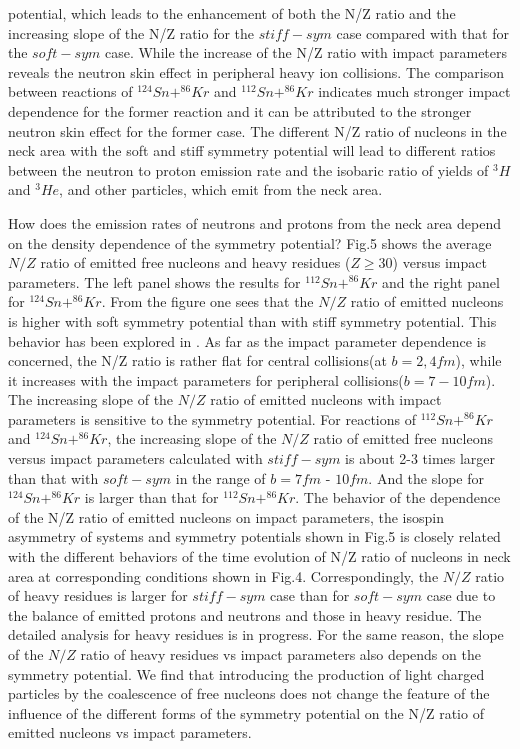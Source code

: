 \documentclass[aps,prc,groupedaddress,showpacs,manuscript]{revtex4}
\begin{document}
potential, which leads to the enhancement of both the N/Z ratio
and the increasing slope of the N/Z ratio for the $stiff-sym$ case
compared with that for the $soft-sym$ case. While the increase of
the N/Z ratio with impact parameters reveals the neutron skin
effect in peripheral heavy ion collisions. The comparison between
reactions of $^{124}Sn+^{86}Kr$ and $^{112}Sn+^{86}Kr$ indicates
much stronger impact dependence for the former reaction and it can
be attributed to the stronger neutron skin effect for the former
case. The different N/Z ratio of nucleons in the neck area with
the soft and stiff symmetry potential will lead to different
ratios between the neutron to proton emission rate and the
isobaric ratio of yields of $^{3}H $ and $^{3}He$, and other
particles, which emit from the neck area.

How does the emission rates of neutrons and protons from the neck
area depend on the density dependence of the symmetry potential?
Fig.5 shows the average $N/Z$ ratio of emitted free nucleons and
heavy residues ($Z\ge30$) versus impact parameters. The left panel
shows the results for $^{112}Sn+^{86}Kr$ and the right panel for
$^{124}Sn+^{86}Kr$. From the figure one sees that the $N/Z$ ratio
of emitted nucleons is higher with soft symmetry potential than
with stiff symmetry potential. This behavior has been explored in
\cite{BALi97}. As far as the impact parameter dependence is
concerned, the N/Z ratio is rather flat for central collisions(at
$b=2,4fm$), while it increases with the impact parameters for
peripheral collisions($b=7-10fm$).  The increasing slope of the
$N/Z$ ratio of emitted nucleons with impact parameters is
sensitive to the symmetry potential. For reactions of
$^{112}Sn+^{86}Kr$ and $^{124}Sn+^{86}Kr$, the increasing slope of
the $N/Z$ ratio of emitted free nucleons versus impact parameters
calculated with $stiff-sym$ is about 2-3 times larger than that
with $soft-sym$ in the range of $b=7fm$ - $10fm$. And the slope
for $^{124}Sn+^{86}Kr$ is larger than that for $^{112}Sn+^{86}Kr$.
The behavior of the dependence of the N/Z ratio of emitted
nucleons on impact parameters, the isospin asymmetry of systems
and symmetry potentials shown in Fig.5 is closely related with the
different behaviors of the time evolution of N/Z ratio of nucleons
in neck area at corresponding conditions shown in Fig.4.
Correspondingly, the $N/Z$ ratio of heavy residues is larger for
$stiff-sym$ case than for $soft-sym$ case due to the balance of
emitted protons and neutrons
 and those in heavy residue. The detailed analysis for heavy
 residues is in progress. For the same reason, the slope of the $N/Z$
ratio of heavy residues vs impact parameters also depends on the
symmetry potential. We find that introducing the production of
light charged particles by the coalescence of free nucleons does
not change the feature of the influence of the different forms of
the symmetry potential on the N/Z ratio of emitted nucleons vs
impact parameters.
\end{document}
